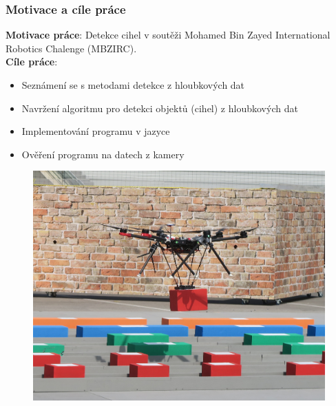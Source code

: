\begin{frame}
    \frametitle{Motivace a cíle práce}
    \textbf{Motivace práce}: Detekce cihel v soutěži Mohamed Bin Zayed International Robotics Chalenge (MBZIRC). \\
    \textbf{Cíle práce}:
    \begin{itemize}
        \item Seznámení se s metodami detekce z hloubkových dat
        \item Navržení algoritmu pro detekci objektů (cihel) z hloubkových dat
        \item Implementování programu  v jazyce \CC
        \item Ověření programu na datech z kamery 
    \end{itemize}
    \begin{figure}
        \includegraphics[width = 0.44\linewidth]{mbzirc.jpg}
    \end{figure}
\end{frame}
